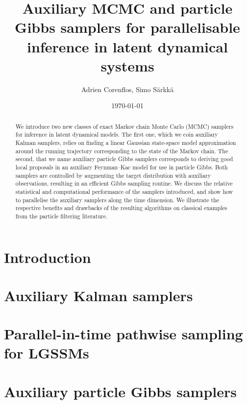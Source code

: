 \documentclass[a4paper,10pt]{article}
\title{Auxiliary MCMC and particle Gibbs samplers for parallelisable inference in latent dynamical systems}
\author{Adrien Corenflos, Simo S\"arkk\"a}
\affil{Department of Electrical Engineering and Automation, Aalto University}
\date{\today}
\begin{document}
    \maketitle

    \begin{abstract}
        We introduce two new classes of exact Markov chain Monte Carlo (MCMC) samplers for inference in latent dynamical models.
        The first one, which we coin auxiliary Kalman samplers, relies on finding a linear Gaussian state-space model approximation around the running trajectory corresponding to the state of the Markov chain. The second, that we name auxiliary particle Gibbs samplers corresponds to deriving good local proposals in an auxiliary Feynman--Kac model for use in particle Gibbs.
        Both samplers are controlled by augmenting the target distribution with auxiliary observations, resulting in an efficient Gibbs sampling routine.
        We discuss the relative statistical and computational performance of the samplers introduced, and show how to parallelise the auxiliary samplers along the time dimension.
        We illustrate the respective benefits and drawbacks of the resulting algorithms on classical examples from the particle filtering literature.
    \end{abstract}


    \section{Introduction}
    \label{sec:introduction}
    


    \section{Auxiliary Kalman samplers}
    \label{sec:auxiliary_samplers}
    


    \section{Parallel-in-time pathwise sampling for LGSSMs}\label{sec:PIT-sampling}
    


    \section{Auxiliary particle Gibbs samplers}
    \label{sec:pgibbs_samplers}
    
\end{document}
